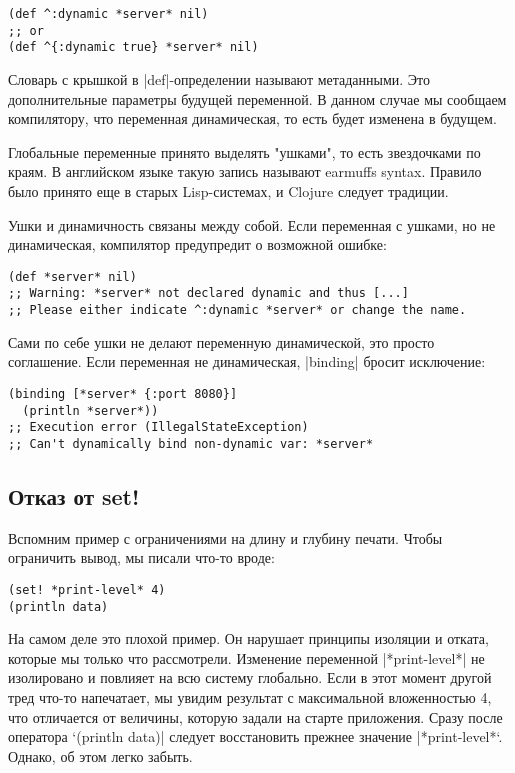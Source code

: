 \begin{verbatim}
(def ^:dynamic *server* nil)
;; or
(def ^{:dynamic true} *server* nil)
\end{verbatim}

Словарь с крышкой в \spverb|def|-определении называют метаданными. Это дополнительные
параметры будущей переменной. В данном случае мы сообщаем компилятору, что
переменная динамическая, то есть будет изменена в будущем.

Глобальные переменные принято выделять "ушками", то есть звездочками по краям. В
английском языке такую запись называют earmuffs syntax. Правило было принято еще
в старых Lisp-системах, и Clojure следует традиции.

Ушки и динамичность связаны между собой. Если переменная с ушками, но не
динамическая, компилятор предупредит о возможной ошибке:

\begin{verbatim}
(def *server* nil)
;; Warning: *server* not declared dynamic and thus [...]
;; Please either indicate ^:dynamic *server* or change the name.
\end{verbatim}

Сами по себе ушки не делают переменную динамической, это просто соглашение. Если
переменная не динамическая, \spverb|binding| бросит исключение:

\begin{verbatim}
(binding [*server* {:port 8080}]
  (println *server*))
;; Execution error (IllegalStateException)
;; Can't dynamically bind non-dynamic var: *server*
\end{verbatim}

\subsection{Отказ от set!}

Вспомним пример с ограничениями на длину и глубину печати. Чтобы ограничить
вывод, мы писали что-то вроде:

\begin{verbatim}
(set! *print-level* 4)
(println data)
\end{verbatim}

На самом деле это плохой пример. Он нарушает принципы изоляции и отката, которые
мы только что рассмотрели. Изменение переменной \spverb|*print-level*| не изолировано и
повлияет на всю систему глобально. Если в этот момент другой тред что-то
напечатает, мы увидим результат с максимальной вложенностью 4, что отличается от
величины, которую задали на старте приложения. Сразу после оператора `(println
data)\spverb| следует восстановить прежнее значение |*print-level*`. Однако, об этом
легко забыть.


